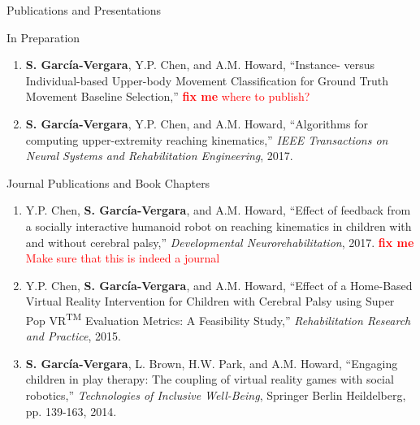 \documentclass{resume} %
\newcommand{\sectionspace}{\vspace{3mm}}
\newcommand{\Sergio}{\textbf{S. Garc\'{i}a-Vergara}}
\newcommand{\SuperPop}{Super Pop VR\textsuperscript{TM}\space}
\newcommand{\fixme}{\textcolor{red}{\textbf{fix me}} \space}
\newcommand{\attention}[1]{\noindent \fixme \textcolor{red}{#1}}
\begin{document}
\sectionspace
\begin{rSection}{Publications and Presentations}

\begin{rSubsection}{In Preparation}{}{}{}
\item
\begin{enumerate}

\item \Sergio, Y.P. Chen, and A.M. Howard, ``Instance- versus Individual-based
  Upper-body Movement Classification for Ground Truth Movement Baseline
  Selection,'' \attention{where to publish?}

\item \Sergio, Y.P. Chen, and A.M. Howard, ``Algorithms for computing
  upper-extremity reaching kinematics,'' \textit{IEEE Transactions on Neural
    Systems and Rehabilitation Engineering}, 2017.

\end{enumerate}
\end{rSubsection}



\sectionspace
\begin{rSubsection}{Journal Publications and Book Chapters}{}{}{}
\item
\begin{enumerate}

\item Y.P. Chen, \Sergio, and A.M. Howard, ``Effect of feedback from a socially
  interactive humanoid robot on reaching kinematics in children with and without
  cerebral palsy,'' \textit{Developmental Neurorehabilitation},
  2017. \attention{Make sure that this is indeed a journal}

\item Y.P. Chen, \Sergio, and A.M. Howard, ``Effect of a Home-Based Virtual
  Reality Intervention for Children with Cerebral Palsy using \SuperPop
  Evaluation Metrics: A Feasibility Study,'' \textit{Rehabilitation Research and
    Practice}, 2015.

\item \Sergio, L. Brown, H.W. Park, and A.M. Howard, ``Engaging children in play
  therapy: The coupling of virtual reality games with social robotics,''
  \textit{Technologies of Inclusive Well-Being}, Springer Berlin Heildelberg,
  pp. 139-163, 2014.
\end{enumerate}
\end{rSubsection}




\end{rSection}
\end{document}
